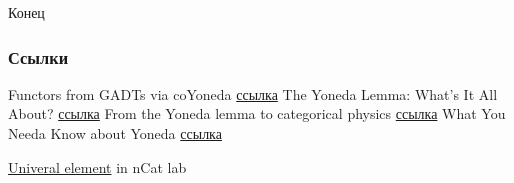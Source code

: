 \documentclass[
  russian,
  aspectratio=169,
  xcolor={svgnames},
  hyperref={colorlinks,citecolor=DeepPink4}]{beamer}
\begin{document}
\begin{frame}[fragile]

 \begin{center}
  \Huge Конец
 \end{center}
\end{frame}

\begin{frame}[allowframebreaks]
  \frametitle<presentation>{Ссылки}
  \begin{thebibliography}{10}
  \beamertemplatebookbibitems
    Functors from GADTs via coYoneda
    \newblock \href{http://www.haskellforall.com/2012/06/gadts.html}{ссылка}
   \bibitem{}
    The Yoneda Lemma: What’s It All About?
    \newblock \href{http://www.maths.ed.ac.uk/~tl/categories/yoneda.ps}{ссылка}
   \bibitem{}
    From the Yoneda lemma to categorical physics
    \newblock \href{https://www.classe.cornell.edu/spr/1999-09/msg0017972.html}{ссылка}
  \bibitem{}
    What You Needa Know about Yoneda
    \newblock \href{https://www.cs.ox.ac.uk/jeremy.gibbons/publications/proyo.pdf}{ссылка}

  \bibitem{}
    \href{https://ncatlab.org/nlab/show/universal\%20element}{Univeral element} in nCat lab



 \end{thebibliography}
\end{frame}
\end{document}

